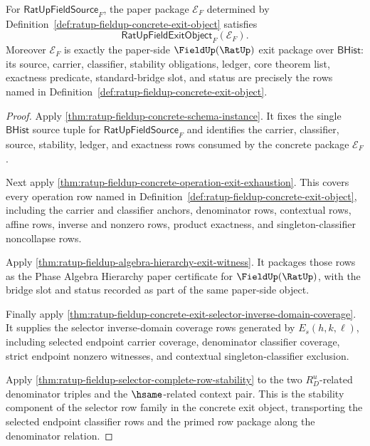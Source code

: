 \begin{theorem}
\label{thm:ratup-fieldup-concrete-exit-object-complete}
For $\mathsf{RatUpFieldSource}_F$, the paper package $\mathcal E_F$ determined
by Definition~\ref{def:ratup-fieldup-concrete-exit-object} satisfies
$$
\mathsf{RatUpFieldExitObject}_F(\mathcal E_F).
$$
Moreover $\mathcal E_F$ is exactly the paper-side $\FieldUp(\RatUp)$ exit
package over $\mathsf{BHist}$: its source, carrier, classifier, stability
obligations, ledger, core theorem list, exactness predicate, standard-bridge
slot, and status are precisely the rows named in
Definition~\ref{def:ratup-fieldup-concrete-exit-object}.
\end{theorem}
\begin{proof}
Apply \autoref{thm:ratup-fieldup-concrete-schema-instance}. It fixes the
single $\mathsf{BHist}$ source tuple for $\mathsf{RatUpFieldSource}_F$ and
identifies the carrier, classifier, source, stability, ledger, and exactness
rows consumed by the concrete package $\mathcal E_F$.

Next apply
\autoref{thm:ratup-fieldup-concrete-operation-exit-exhaustion}. This covers
every operation row named in
Definition~\ref{def:ratup-fieldup-concrete-exit-object}, including the carrier
and classifier anchors, denominator rows, contextual rows, affine rows, inverse
and nonzero rows, product exactness, and singleton-classifier noncollapse rows.

Apply \autoref{thm:ratup-fieldup-algebra-hierarchy-exit-witness}. It packages
those rows as the Phase Algebra Hierarchy paper certificate for
$\FieldUp(\RatUp)$, with the bridge slot and status recorded as part of the
same paper-side object.

Finally apply
\autoref{thm:ratup-fieldup-concrete-exit-selector-inverse-domain-coverage}. It
supplies the selector inverse-domain coverage rows generated by
$E_s(h,k,\ell)$, including selected endpoint carrier coverage, denominator
classifier coverage, strict endpoint nonzero witnesses, and contextual
singleton-classifier exclusion.

Apply \autoref{thm:ratup-fieldup-selector-complete-row-stability} to the two
$R_D^u$-related denominator triples and the $\hsame$-related context pair. This
is the stability component of the selector row family in the concrete exit
object, transporting the selected endpoint classifier rows and the primed row
package along the denominator relation.


\end{proof}
